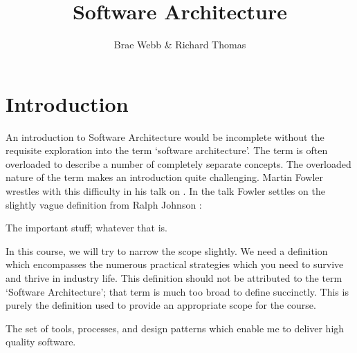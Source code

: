\title{Software Architecture}
\author{Brae Webb \& Richard Thomas}
\date{}

\maketitle

\section{Introduction}
An introduction to Software Architecture would be incomplete without the requisite
exploration into the term `software architecture'.
The term is often overloaded to describe a number of completely separate concepts.
The overloaded nature of the term makes an introduction quite challenging.
Martin Fowler wrestles with this difficulty in his talk on .
In the talk Fowler settles on the slightly vague definition from Ralph Johnson \cite{fowler-what-is-architecture}:

\begin{definition}
The important stuff; whatever that is.
\end{definition}

In this course, we will try to narrow the scope slightly.
We need a definition which encompasses the numerous practical strategies which you need to survive and thrive in industry life.
This definition should not be attributed to the term `Software Architecture'; that term is much too broad to define succinctly.
This is purely the definition used to provide an appropriate scope for the course.

\begin{definition}
The set of tools, processes, and design patterns which enable me to deliver high quality software.
\end{definition}


